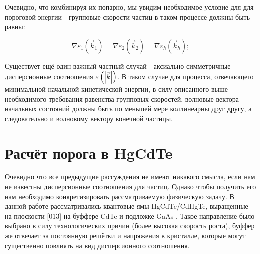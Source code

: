\documentclass[../main.tex]{subfiles}
\begin{document}
    Очевидно, что комбинируя их попарно, мы увидим необходимое условие для для пороговой
    энергии - групповые скорости частиц в таком процессе должны быть равны:

    \begin{equation}
        \nabla \varepsilon_1(\vec{k}_1) = \nabla \varepsilon_2(\vec{k}_2) = \nabla \varepsilon_h(\vec{k}_h);
    \end{equation}

    




    Существует ещё один важный частный случай - аксиально-симметричные дисперсионные
    соотношения $\varepsilon\left(\abs{\vec k}\right)$. В таком случае для процесса,
    отвечающего минимальной начальной кинетической энергии, в силу описанного выше 
    необходимого требования равенства групповых скоростей, волновые вектора начальных
    состояний должны быть по меньшей мере коллинеарны друг другу, а следовательно и 
    волновому вектору конечной частицы.

    \section{Расчёт порога в HgCdTe}

        Очевидно что все предыдущие рассуждения не имеют никакого смысла, если нам не известны дисперсионные 
        соотношения для частиц. Однако чтобы получить его нам необходимо конкретизировать
        рассматриваемую физическую задачу. В данной работе рассматривались квантовые ямы HgCdTe/CdHgTe, выращенные 
        на плоскости [013] на буффере CdTe и подложке GaAs \cite{Varavin:2003}. Такое направление было выбрано в силу технологических причин (более
        высокая скорость роста), буффер же отвечает за постоянную решётки и напряжения в кристалле,
        которые могут существенно повлиять на вид дисперсионного соотношения.
\end{document}
